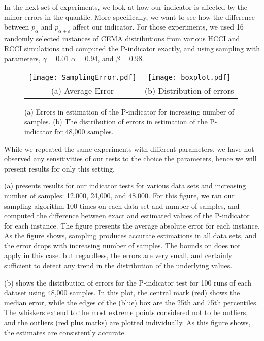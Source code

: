 \documentclass[final]{siamltex}
\newcommand{\eps}{\varepsilon}
\newcommand{\pmetric}{P}
\newcommand{\pt}{{p}}
\begin{document}
In the next set of experiments, we look at how our indicator is affected by the
minor errors in the quantile. More specifically, we want to see  how the
difference between ${\pt}_{\alpha}$ and  ${\pt}_{\alpha+\eps}$ affect our
indicator.  
For those experiments,  we  used 16 randomly selected instances  of
CEMA  distributions from various HCCI and RCCI simulations and computed  the
\pmetric-indicator exactly, and using sampling  with parameters, $\gamma=0.01$ $\alpha=0.94$, and $\beta=0.98$. 
\begin{figure}[th] \centering
   \begin{tabular}{cc}
  \hspace*{-0.08\textwidth}    
  \texttt{[image: SamplingError.pdf]}   &
  \texttt{[image: boxplot.pdf]} \\
 (a)  Average Error & (b) Distribution of errors  
\end{tabular}
\caption{(a)  Errors in  estimation of  the \pmetric-indicator for
 increasing number of samples.
(b)  The distribution of errors in  estimation of  the \pmetric-indicator  for 48,000
samples.}
   \label{fig:Boxquantiles}
\end{figure}
While we repeated the same experiments with different parameters, we have not observed any sensitivities of our tests to  the choice the parameters,  hence we will present results for only this setting.  

(a) presents results for our indicator tests for various data sets and increasing number of
samples: 12,000, 24,000, and 48,000.  For this figure, we ran our sampling
algorithm 100 times  on each data set  and number of samples, and  computed
the difference between  exact  and estimated values of the \pmetric-indicator  
for each instance.  The figure presents the average absolute error for each 
instance. As the figure shows, sampling  produces accurate estimations in all 
data sets, and the error drops with increasing number of samples. The bounds 
on  does not apply in this case. but regardless, the errors are 
very small, and certainly sufficient  to detect any trend in the distribution of the underlying values. 

(b) shows the  distribution of errors for the
\pmetric-indicator test for 100 runs of each dataset using 48,000 samples. 
In this  plot, the central mark (red) shows the median error, while the edges of the (blue) box are the 25th
and 75th percentiles. The whiskers extend to the most extreme points considered not
to be outliers, and the outliers (red plus marks) are plotted individually. As  this figure shows,  the estimates are consistently accurate. 
\end{document}
